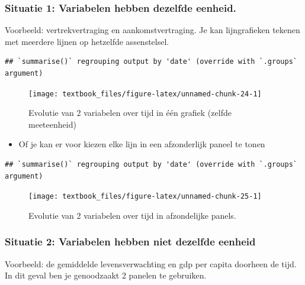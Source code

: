 \documentclass[]{tufte-book}
\providecommand{\tightlist}{%
  \setlength{\itemsep}{0pt}\setlength{\parskip}{0pt}}
\begin{document}
\hypertarget{situatie-1-variabelen-hebben-dezelfde-eenheid.}{%
\subsubsection{Situatie 1: Variabelen hebben dezelfde eenheid.}\label{situatie-1-variabelen-hebben-dezelfde-eenheid.}}

Voorbeeld: vertrekvertraging en aankomstvertraging. Je kan lijngrafieken tekenen met meerdere lijnen op hetzelfde assenstelsel.

\begin{verbatim}
## `summarise()` regrouping output by 'date' (override with `.groups` argument)
\end{verbatim}

\begin{figure}
\texttt{[image: textbook\_files/figure-latex/unnamed-chunk-24-1]} \caption[Evolutie van 2 variabelen over tijd in één grafiek (zelfde meeteenheid)]{Evolutie van 2 variabelen over tijd in één grafiek (zelfde meeteenheid)}\label{fig:unnamed-chunk-24}
\end{figure}

\begin{itemize}
\tightlist
\item
  Of je kan er voor kiezen elke lijn in een afzonderlijk paneel te tonen
\end{itemize}

\begin{verbatim}
## `summarise()` regrouping output by 'date' (override with `.groups` argument)
\end{verbatim}

\begin{figure}
\texttt{[image: textbook\_files/figure-latex/unnamed-chunk-25-1]} \caption[Evolutie van 2 variabelen over tijd in afzondelijke panels]{Evolutie van 2 variabelen over tijd in afzondelijke panels.}\label{fig:unnamed-chunk-25}
\end{figure}

\hypertarget{situatie-2-variabelen-hebben-niet-dezelfde-eenheid}{%
\subsubsection{Situatie 2: Variabelen hebben niet dezelfde eenheid}\label{situatie-2-variabelen-hebben-niet-dezelfde-eenheid}}

Voorbeeld: de gemiddelde levensverwachting en gdp per capita doorheen de tijd. In dit geval ben je genoodzaakt 2 panelen te gebruiken.
\end{document}
